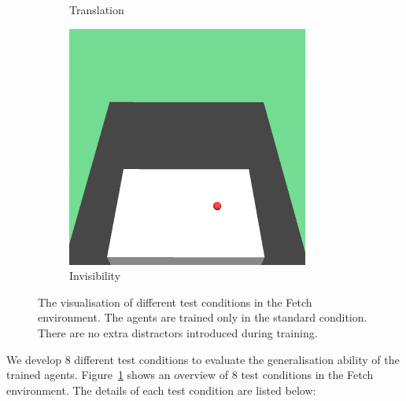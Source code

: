 \begin{figure}[h!]
\begin{subfigure}{0.32\textwidth}
    \caption{Translation}
  \end{subfigure}
  \begin{subfigure}{0.32\textwidth}
    \includegraphics[width=\textwidth]{figures/chapter6/test_observations/invisible}
    \caption{Invisibility}
  \end{subfigure}
  \caption[The visualisation of different test conditions in the Fetch environment.]{The visualisation of different test conditions in the Fetch environment. The agents are trained only in the standard condition. There are no extra distractors introduced during training.}
  \label{fig:tests}
\end{figure}
We develop 8 different test conditions to evaluate the generalisation ability of the trained agents. Figure~\ref{fig:tests} shows an overview of 8 test conditions in the Fetch environment. The details of each test condition are listed below:
